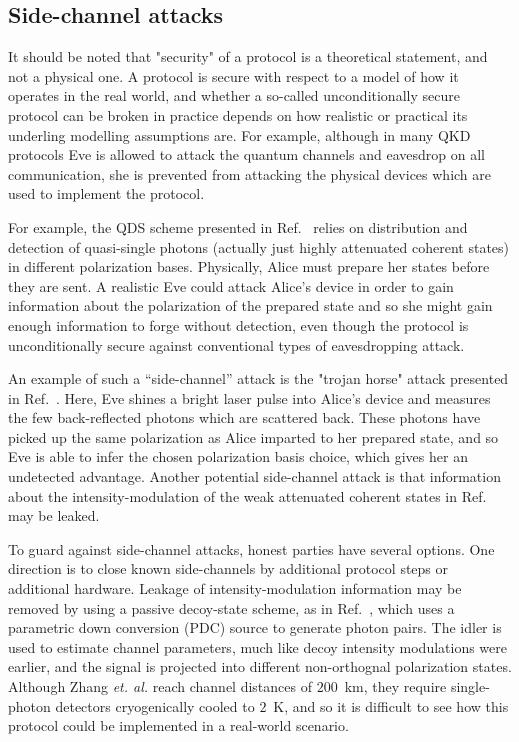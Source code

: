\subsection{Side-channel attacks}
It should be noted that "security" of a protocol is a theoretical statement, and not a physical one. A protocol is secure with respect to a model of how it operates in the real world, and whether a so-called unconditionally secure protocol can be broken in practice depends on how realistic or practical its underling modelling assumptions are. For example, although in many QKD protocols Eve is allowed to attack the quantum channels and eavesdrop on all communication, she is prevented from attacking the physical devices which are used to implement the protocol. 

For example, the QDS scheme presented in Ref.~\cite{Amiri2016} relies on distribution and detection of quasi-single photons (actually just highly attenuated coherent states) in different polarization bases. Physically, Alice must prepare her states before they are sent. A realistic Eve could attack Alice's device in order to gain information about the polarization of the prepared state and so she might gain enough information to forge without detection, even though the protocol is unconditionally secure against conventional types of eavesdropping attack.

An example of such a ``side-channel'' attack is the "trojan horse" attack presented in Ref.~\cite{Jain2014}. Here, Eve shines a bright laser pulse into Alice's device and measures the few back-reflected photons which are scattered back. These photons have picked up the same polarization as Alice imparted to her prepared state, and so Eve is able to infer the chosen polarization basis choice, which gives her an undetected advantage. Another potential side-channel attack is that information about the intensity-modulation of the weak attenuated coherent states in Ref.~\cite{Amiri2016, Yin2016c} may be leaked.



To guard against side-channel attacks, honest parties have several options. One direction is to close known side-channels by additional protocol steps or additional hardware. Leakage of intensity-modulation information may be removed by using a passive decoy-state scheme, as in Ref.~\cite{Zhang2018}, which uses a parametric down conversion (PDC) source to generate photon pairs. The idler is used to estimate channel parameters, much like decoy intensity modulations were earlier, and the signal is projected into different non-orthognal polarization states. Although Zhang \emph{et. al.} reach channel distances of $200$~km, they require single-photon detectors cryogenically cooled to $2$~K, and so it is difficult to see how this protocol could be implemented in a real-world scenario.


